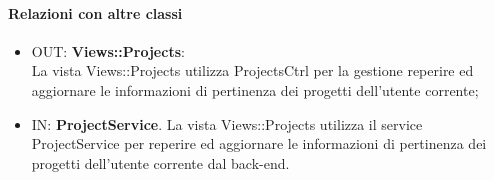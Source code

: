 	\paragraph{Relazioni con altre classi}
	\begin{itemize}
	  \item OUT: \textbf{Views::Projects}:\\
		La vista Views::Projects utilizza ProjectsCtrl per la gestione reperire ed aggiornare le informazioni di pertinenza dei progetti dell'utente corrente;	
	  \item IN: \textbf{ProjectService}.
		La vista Views::Projects utilizza il service ProjectService per reperire ed aggiornare le informazioni di pertinenza dei progetti dell'utente corrente dal back-end.
	\end{itemize}	




































